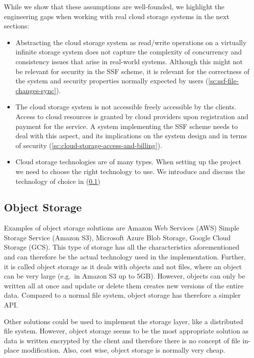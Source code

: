 While we show that these assumptions are well-founded,
we highlight the engineering gaps when working with
real cloud storage systems in the next sections:
\begin{itemize}
    \item Abstracting the cloud storage system as read/write
    operations on a virtually infinite storage system does
    not capture the complexity of concurrency and consistency
    issues that arise in real-world systems. Although this
    might not be relevant for security in the SSF scheme,
    it is relevant for the correctness of the system and
    security properties normally expected by users (\cref{sc:ssf-file-changes-sync}).
    \item The cloud storage system is not accessible freely
    accessible by the clients. Access to cloud resources is
    granted by cloud providers upon registration and payment
    for the service. A system implementing the SSF scheme
    needs to deal with this aspect, and its implications
    on the system design and in terms of security (\cref{sc:cloud-storage-access-and-billing}).
    \item Cloud storage technologies are of many types.
    When setting up the project we need to choose the right
    technology to use. We introduce and discuss the technology of choice in (\cref{ssc:object-storage})
\end{itemize}

\subsection{Object Storage}\label{ssc:object-storage}
Examples of object storage solutions are Amazon Web Services (AWS)
Simple Storage Service (Amazon S3), Microsoft Azure Blob Storage, Google Cloud Storage (GCS).
This type of storage has all the characteristics aforementioned and can 
therefore be the actual technology used in the implementation. 
Further, it is called object storage as it deals with objects and not files, 
where an object can be very large (e.g.\ in Amazon S3 up to 5GB).
However, objects can only be written all at once
and update or delete them creates new versions of the entire data.
Compared to a normal file system, object storage has therefore a simpler API.

Other solutions could be used to implement the storage layer,
like a distributed file system.
However, object storage seems to be the most appropriate
solution as data is written encrypted by the client and therefore
there is no concept of file in-place modification.
Also, cost wise, object storage is normally very cheap.

